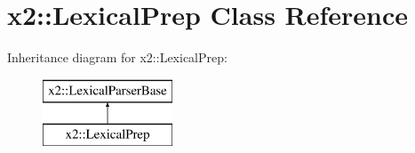 \hypertarget{classx2_1_1_lexical_prep}{}\section{x2\+:\+:Lexical\+Prep Class Reference}
\label{classx2_1_1_lexical_prep}
Inheritance diagram for x2\+:\+:Lexical\+Prep\+:\begin{figure}[H]
\begin{center}
\leavevmode
\includegraphics[height=2.000000cm]{classx2_1_1_lexical_prep}
\end{center}
\end{figure}
